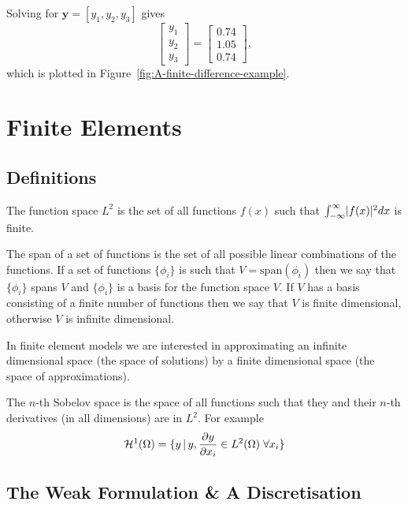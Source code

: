 Solving for $\mathbf{y} = [ y_1, y_2, y_3]$ gives
\begin{equation*}
  \left[
    \begin{array}{c}
      y_{1}\\ y_{2}\\ y_{3}
    \end{array}
  \right]=\left[
    \begin{array}{c}
      0.74\\ 1.05\\ 0.74
    \end{array}
  \right],
\end{equation*}
which is plotted in Figure~\ref{fig:A-finite-difference-example}.


\section{Finite Elements}
\label{sec:finite-elements-one-d}

\subsection{Definitions}
\label{sec:fem-definitions}

The function space $L^{2}$ is the set of all functions $f(x)$ such
that $\intop_{-\infty}^{\infty}\abs{f(x)}^{2}dx$ is finite.

The span of a set of functions is the set of all possible linear combinations of
the functions. If a set of functions $\{\phi_{i}\}$ is such that
$V=\text{span}(\phi_{i})$ then we say that $\{\phi_{i}\}$ spans $V$ and
$\{\phi_{i}\}$ is a basis for the function space $V$. If $V$ has a basis consisting of a finite number of functions then we say that $V$ is finite dimensional, otherwise $V$ is infinite dimensional.

In finite element models we are interested in approximating an infinite
dimensional space (the space of solutions) by a finite dimensional
space (the space of approximations).

The $n$-th Sobelov space is the space of all functions such that they and their $n$-th derivatives (in all dimensions) are in $L^2$. For example
\begin{equation}
  \label{eq:H1}
  \mathcal{H}^1(\Omega) = \{ y \,|\, y, \frac{\partial y}{\partial x_i} \in L^2(\Omega) \; \forall x_i \}
\end{equation}

\subsection{The Weak Formulation \& A Discretisation}
\label{Derivation-of-weighted-residuals}

